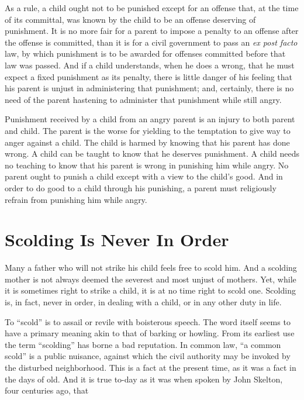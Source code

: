 \documentclass[
]{book}
\begin{document}
As a rule, a child ought not to be punished except for an offense that, at the time of its committal, was known by the child to be an offense deserving of punishment. It is no more fair for a parent to impose a penalty to an offense after the offense is committed, than it is for a civil government to pass an \emph{ex post facto} law, by which punishment is to be awarded for offenses committed before that law was passed. And if a child understands, when he does a wrong, that he must expect a fixed punishment as its penalty, there is little danger of his feeling that his parent is unjust in administering that punishment; and, certainly, there is no need of the parent hastening to administer that punishment while still angry.

Punishment received by a child from an angry parent is an injury to both parent and child. The parent is the worse for yielding to the temptation to give way to anger against a child. The child is harmed by knowing that his parent has done wrong. A child can be taught to know that he deserves punishment. A child needs no teaching to know that his parent is wrong in punishing him while angry. No parent ought to punish a child except with a view to the child's good. And in order to do good to a child through his punishing, a parent must religiously refrain from punishing him while angry.

\hypertarget{scolding-is-never-in-order}{%
\chapter{Scolding Is Never In Order}\label{scolding-is-never-in-order}}

Many a father who will not strike his child feels free to scold him. And a scolding mother is not always deemed the severest and most unjust of mothers. Yet, while it is sometimes right to strike a child, it is at no time right to scold one. Scolding is, in fact, never in order, in dealing with a child, or in any other duty in life.

To ``scold'' is to assail or revile with boisterous speech. The word itself seems to have a primary meaning akin to that of barking or howling. From its earliest use the term ``scolding'' has borne a bad reputation. In common law, ``a common scold'' is a public nuisance, against which the civil authority may be invoked by the disturbed neighborhood. This is a fact at the present time, as it was a fact in the days of old. And it is true to-day as it was when spoken by John Skelton, four centuries ago, that
\end{document}

